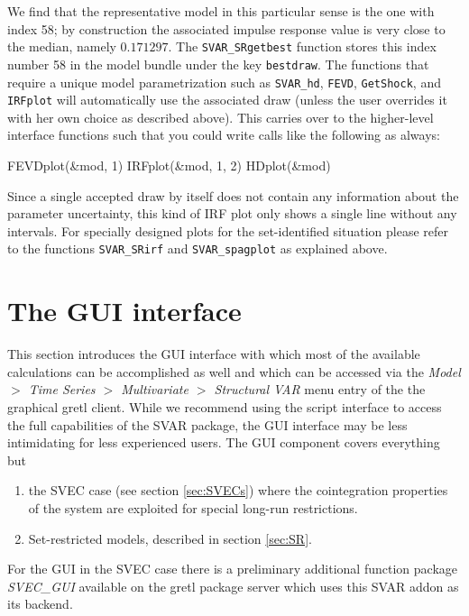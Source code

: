 \documentclass[a4paper,10pt]{article}
\newcommand{\app}[1]{\textsf{#1}}
\newcounter{script}[section]
\begin{document}
We find that the representative model in this particular sense is the one with index 58; 
by construction the associated impulse response value is very close to the median, namely $0.171297$.
The \texttt{SVAR\_SRgetbest} function stores this index number 58 in the model bundle under the key
\texttt{bestdraw}. The functions that require a unique model parametrization such as 
\texttt{SVAR\_hd}, \texttt{FEVD}, \texttt{GetShock}, and \texttt{IRFplot}  
will automatically use the associated draw (unless the user overrides it with her own choice as
described above). This carries over to the higher-level interface functions such that you could write 
calls like the following as always:

\begin{code}
FEVDplot(&mod, 1)
IRFplot(&mod, 1, 2)
HDplot(&mod)
\end{code}

Since a single accepted draw by itself does not contain any information about the parameter uncertainty, 
this kind of IRF plot only shows a single line without any intervals. For specially designed plots for the 
set-identified situation please refer to the functions \texttt{SVAR\_SRirf} and \texttt{SVAR\_spagplot} 
as explained above.




\appendix

\pagebreak

\section{The GUI interface}
\label{sec:GUI}

This section introduces the GUI interface with which most of the
available calculations can be accomplished as well and which can be
accessed via the \emph{Model $>$ Time Series $>$ Multivariate $>$ 
Structural VAR}
menu entry of the the graphical \app{gretl} client.  While we recommend
using the script interface to access the full capabilities of the SVAR
package, the GUI interface may be less intimidating for less
experienced users. The GUI component covers everything but
\begin{enumerate}
\item the SVEC case (see section \ref{sec:SVECs}) where the
  cointegration properties of the system are exploited for special
  long-run restrictions.
\item Set-restricted models, described in section \ref{sec:SR}.
\end{enumerate}
For the GUI in the SVEC case there is a preliminary additional
function package \emph{SVEC\_GUI} available on the gretl package
server which uses this SVAR addon as its backend.
\end{document}
